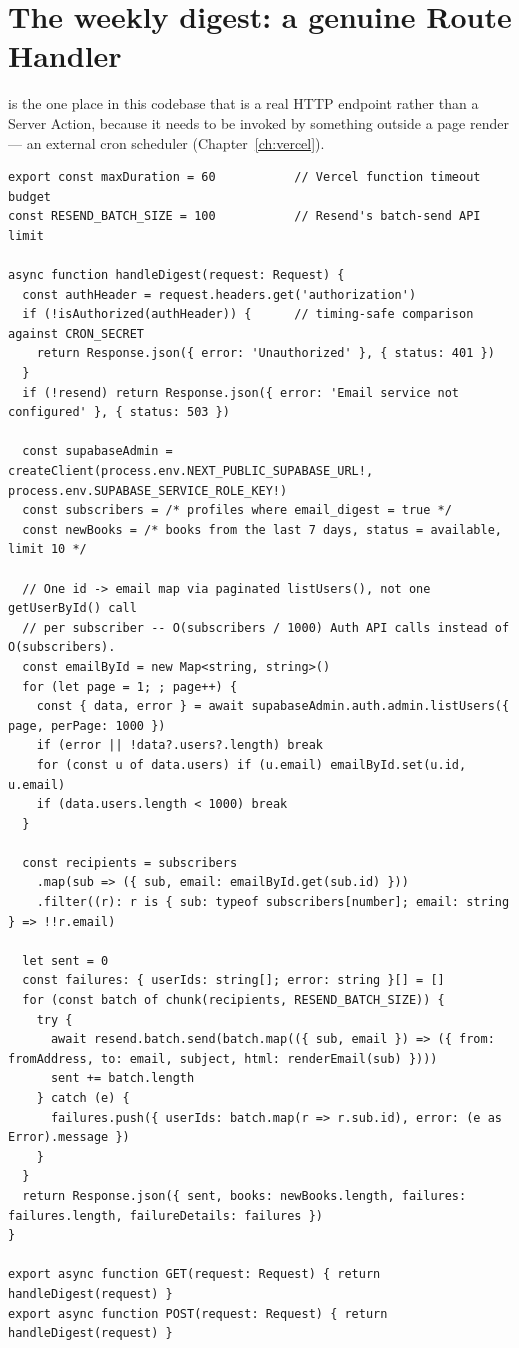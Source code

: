 \section{The weekly digest: a genuine Route Handler}

 is the one place in this codebase that is a real HTTP endpoint rather than a Server Action, because it needs to be invoked by something outside a page render — an external cron scheduler (Chapter~\ref{ch:vercel}).

\begin{lstlisting}[caption={app/api/digest/route.ts — auth gate, batched email lookup, batched send}]
export const maxDuration = 60           // Vercel function timeout budget
const RESEND_BATCH_SIZE = 100           // Resend's batch-send API limit

async function handleDigest(request: Request) {
  const authHeader = request.headers.get('authorization')
  if (!isAuthorized(authHeader)) {      // timing-safe comparison against CRON_SECRET
    return Response.json({ error: 'Unauthorized' }, { status: 401 })
  }
  if (!resend) return Response.json({ error: 'Email service not configured' }, { status: 503 })

  const supabaseAdmin = createClient(process.env.NEXT_PUBLIC_SUPABASE_URL!, process.env.SUPABASE_SERVICE_ROLE_KEY!)
  const subscribers = /* profiles where email_digest = true */
  const newBooks = /* books from the last 7 days, status = available, limit 10 */

  // One id -> email map via paginated listUsers(), not one getUserById() call
  // per subscriber -- O(subscribers / 1000) Auth API calls instead of O(subscribers).
  const emailById = new Map<string, string>()
  for (let page = 1; ; page++) {
    const { data, error } = await supabaseAdmin.auth.admin.listUsers({ page, perPage: 1000 })
    if (error || !data?.users?.length) break
    for (const u of data.users) if (u.email) emailById.set(u.id, u.email)
    if (data.users.length < 1000) break
  }

  const recipients = subscribers
    .map(sub => ({ sub, email: emailById.get(sub.id) }))
    .filter((r): r is { sub: typeof subscribers[number]; email: string } => !!r.email)

  let sent = 0
  const failures: { userIds: string[]; error: string }[] = []
  for (const batch of chunk(recipients, RESEND_BATCH_SIZE)) {
    try {
      await resend.batch.send(batch.map(({ sub, email }) => ({ from: fromAddress, to: email, subject, html: renderEmail(sub) })))
      sent += batch.length
    } catch (e) {
      failures.push({ userIds: batch.map(r => r.sub.id), error: (e as Error).message })
    }
  }
  return Response.json({ sent, books: newBooks.length, failures: failures.length, failureDetails: failures })
}

export async function GET(request: Request) { return handleDigest(request) }
export async function POST(request: Request) { return handleDigest(request) }
\end{lstlisting}

